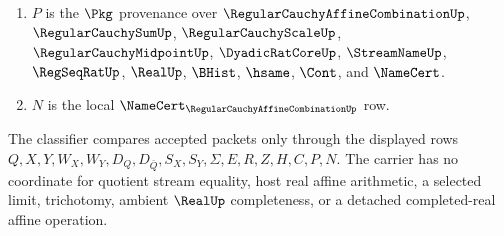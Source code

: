 \begin{definition}
\begin{enumerate}
\item $P$ is the $\Pkg$ provenance over $\RegularCauchyAffineCombinationUp$, $\RegularCauchySumUp$, $\RegularCauchyScaleUp$, $\RegularCauchyMidpointUp$, $\DyadicRatCoreUp$, $\StreamNameUp$, $\RegSeqRatUp$, $\RealUp$, $\BHist$, $\hsame$, $\Cont$, and $\NameCert$.
\item $N$ is the local $\NameCert_{\RegularCauchyAffineCombinationUp}$ row.
\end{enumerate}
The classifier compares accepted packets only through the displayed rows $Q,X,Y,W_X,W_Y,D_Q,D_{\bar Q},S_X,S_Y,\Sigma,E,R,Z,H,C,P,N$. The carrier has no coordinate for quotient stream equality, host real affine arithmetic, a selected limit, trichotomy, ambient $\RealUp$ completeness, or a detached completed-real affine operation.
\end{definition}

